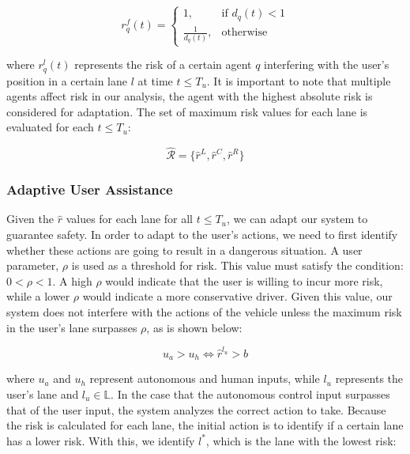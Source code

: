\documentclass[conference]{IEEEtran}
\begin{document}
\begin{equation}
    r_{q}^{f}(t) =
    \begin{cases}
    1,                      & \text{if } d_{q}(t) < 1 \\
    \frac{1}{d_{q}(t)},  & \text{otherwise} 
    \end{cases}
\end{equation}

where $r_{q}^{l}(t)$ represents the risk of a certain agent $q$ interfering with the user's position in a certain lane $l$ at time $t \leq T_u$. It is important to note that multiple agents affect risk in our analysis, the agent with the highest absolute risk is considered for adaptation. The set of maximum risk values for each lane is evaluated for each $t \leq T_u$:

\begin{equation}
    \hat{\mathcal{R}} = \{\hat{r}^{L},\hat{r}^{C},\hat{r}^{R}\}
\end{equation}

\subsubsection{Adaptive User Assistance}
Given the $\hat{r}$ values for each lane for all $t \leq T_u$, we can adapt our system to guarantee safety. In order to adapt to the user's actions, we need to first identify whether these actions are going to result in a dangerous situation. A user parameter, $\rho$ is used as a threshold for risk. This value must satisfy the condition: $0<\rho<1$. A high $\rho$ would indicate that the user is willing to incur more risk, while a lower $\rho$ would indicate a more conservative driver. Given this value, our system does not interfere with the actions of the vehicle unless the maximum risk in the user's lane surpasses $\rho$, as is shown below:

\begin{equation}
    u_a > u_h \iff \hat r^{l_u} > b
\end{equation}

where $u_a$ and $u_h$ represent autonomous and human inputs, while $l_u$ represents the user's lane and $l_u \in \mathbb{L}$. In the case that the autonomous control input surpasses that of the user input, the system analyzes the correct action to take. Because the risk is calculated for each lane, the initial action is to identify if a certain lane has a lower risk. With this, we identify $l^*$, which is the lane with the lowest risk:
\end{document}
